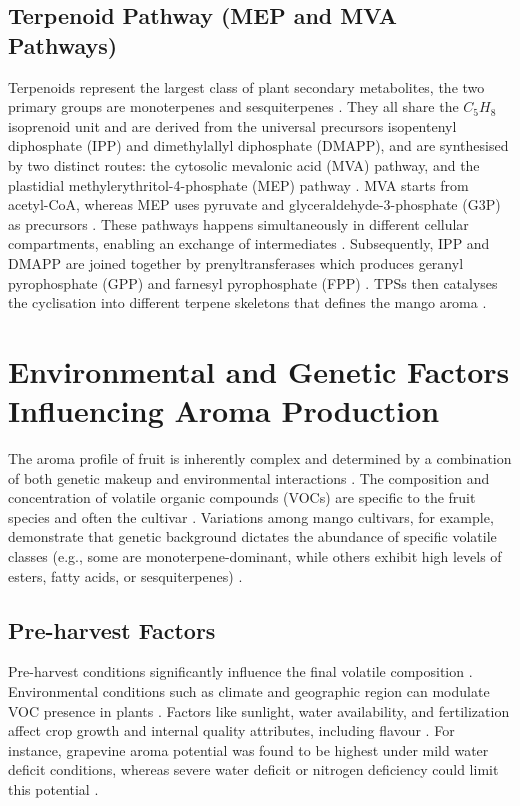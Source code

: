 \subsection{Terpenoid Pathway (MEP and MVA Pathways)}
Terpenoids represent the largest class of plant secondary metabolites, the two primary groups are monoterpenes and sesquiterpenes \cite*{A04_GUO2023112779, A02_Moreno2010, A09_Barras2024}. They all share the $C_5H_8$ isoprenoid unit and are derived from the universal precursors isopentenyl diphosphate (IPP) and dimethylallyl diphosphate (DMAPP), and are synthesised by two distinct routes: the cytosolic mevalonic acid (MVA) pathway, and the plastidial methylerythritol-4-phosphate (MEP) pathway \cite*{A09_Barras2024,A13_ElHadi2013}. MVA starts from acetyl-CoA, whereas MEP uses pyruvate and glyceraldehyde-3-phosphate (G3P) as precursors \cite*{A09_Barras2024}. These pathways happens simultaneously in different cellular compartments, enabling an exchange of intermediates \cite*{A09_Barras2024}. Subsequently, IPP and DMAPP are joined together by prenyltransferases which produces geranyl pyrophosphate (GPP) and farnesyl pyrophosphate (FPP) \cite*{A09_Barras2024,A13_ElHadi2013}. TPSs then catalyses the cyclisation into different terpene skeletons that defines the mango aroma \cite*{A09_Barras2024,A13_ElHadi2013}.


\section{Environmental and Genetic Factors Influencing Aroma Production}
The aroma profile of fruit is inherently complex and determined by a combination of both genetic makeup and environmental interactions \cite*{A13_ElHadi2013,A16_Tandel2023}. The composition and concentration of volatile organic compounds (VOCs) are specific to the fruit species and often the cultivar \cite*{A13_ElHadi2013,A16_Tandel2023}. Variations among mango cultivars, for example, demonstrate that genetic background dictates the abundance of specific volatile classes (e.g., some are monoterpene-dominant, while others exhibit high levels of esters, fatty acids, or sesquiterpenes) \cite*{A16_Tandel2023}.


\subsection{Pre-harvest Factors}
 Pre-harvest conditions significantly influence the final volatile composition \cite*{A13_ElHadi2013}. Environmental conditions such as climate and geographic region can modulate VOC presence in plants \cite*{A01_Aguirre-Lopez_2023,A16_Tandel2023}. Factors like sunlight, water availability, and fertilization affect crop growth and internal quality attributes, including flavour \cite*{A13_ElHadi2013}. For instance, grapevine aroma potential was found to be highest under mild water deficit conditions, whereas severe water deficit or nitrogen deficiency could limit this potential \cite*{A13_ElHadi2013}.


